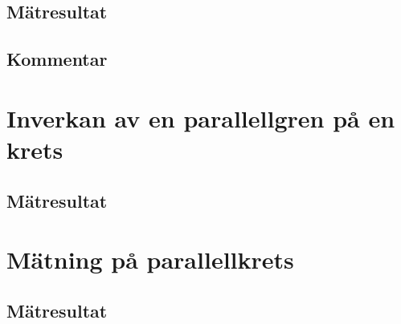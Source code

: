 \documentclass[11pt,a4paper]{article}
\begin{document}
\subsection{Mätresultat}\label{}

\subsection{Kommentar}\label{}


\section{Inverkan av en parallellgren på en krets}\label{}

\subsection{Mätresultat}\label{}


\section{Mätning på parallellkrets}\label{}

\subsection{Mätresultat}\label{}
\end{document}
